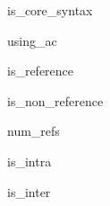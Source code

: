 \begin{pseudo}{is\_core\_syntax}{}
\end{pseudo}

\begin{pseudo}{using\_ac}{}
\end{pseudo}

\begin{pseudo}{is\_reference}{}
\end{pseudo}

\begin{pseudo}{is\_non\_reference}{}
\end{pseudo}

\begin{pseudo}{num\_refs}{}
\end{pseudo}

\begin{pseudo}{is\_intra}{}
\end{pseudo}

\begin{pseudo}{is\_inter}{}
\end{pseudo}

